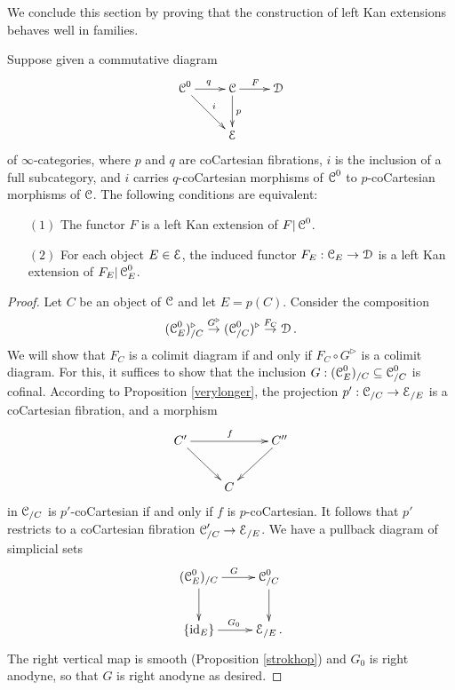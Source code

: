 We conclude this section by proving that the construction of left Kan extensions behaves well in families.

\begin{lemma}\label{longerwait}
Suppose given a commutative diagram
$$ \xymatrix{ \calC^{0} \ar[r]^{q} \ar[dr]^{i} & \calC \ar[d]^{p} \ar[r]^{F} & \calD \\
& \calE & } $$
of $\infty$-categories, where $p$ and $q$ are coCartesian fibrations, 
$i$ is the inclusion of a full subcategory, and $i$ carries $q$-coCartesian morphisms
of $\operatorname{\mathcal{C}}^{0}$ to $p$-coCartesian morphisms of $\operatorname{\mathcal{C}}$. The following conditions are equivalent:
\begin{itemize}
\item[$(1)$] The functor $F$ is a left Kan extension of $F| \operatorname{\mathcal{C}}^{0}$. 
\item[$(2)$] For each object $E \in \operatorname{\mathcal{E}}$, the induced functor
$F_{E}: \operatorname{\mathcal{C}}_{E} \rightarrow \operatorname{\mathcal{D}}$ is a left Kan extension of $F_E | \operatorname{\mathcal{C}}^{0}_{E}$. 
\end{itemize}
\end{lemma}

\begin{proof}
Let $C$ be an object of $\operatorname{\mathcal{C}}$ and let $E = p(C)$. Consider the composition
$$ (\operatorname{\mathcal{C}}^0_{E})^{\triangleright}_{/C} \stackrel{G^{\triangleright}}{\rightarrow} (\operatorname{\mathcal{C}}^{0}_{/C})^{\triangleright} \stackrel{F_{C}}{\rightarrow} \operatorname{\mathcal{D}}.$$
We will show that $F_C$ is a colimit diagram if and only if $F_C \circ G^{\triangleright}$ is a colimit diagram. For this, it suffices to show that the inclusion $G: (\operatorname{\mathcal{C}}^{0}_{E})_{/C} \subseteq
\operatorname{\mathcal{C}}^{0}_{/C}$ is cofinal. According to Proposition \ref{verylonger}, the projection $p': \operatorname{\mathcal{C}}_{/C} \rightarrow \operatorname{\mathcal{E}}_{/E}$
is a coCartesian fibration, and a morphism
$$ \xymatrix{ C' \ar[rr]^{f} \ar[dr] & & C'' \ar[dl] \\
& C & }$$
in $\operatorname{\mathcal{C}}_{/C}$ is $p'$-coCartesian if and only if $f$ is $p$-coCartesian. It follows that
$p'$ restricts to a coCartesian fibration $\operatorname{\mathcal{C}}'_{/C} \rightarrow \operatorname{\mathcal{E}}_{/E}$. 
We have a pullback diagram of simplicial sets
$$ \xymatrix{ (\calC^{0}_{E})_{/C} \ar[r]^{G} \ar[d] & \calC^0_{/C} \ar[d] \\
\{ \id_{E} \} \ar[r]^{G_0} & \calE_{/E}. }$$
The right vertical map is smooth (Proposition \ref{strokhop}) and $G_0$ is right anodyne, so that $G$ is right anodyne as desired.
\end{proof}

